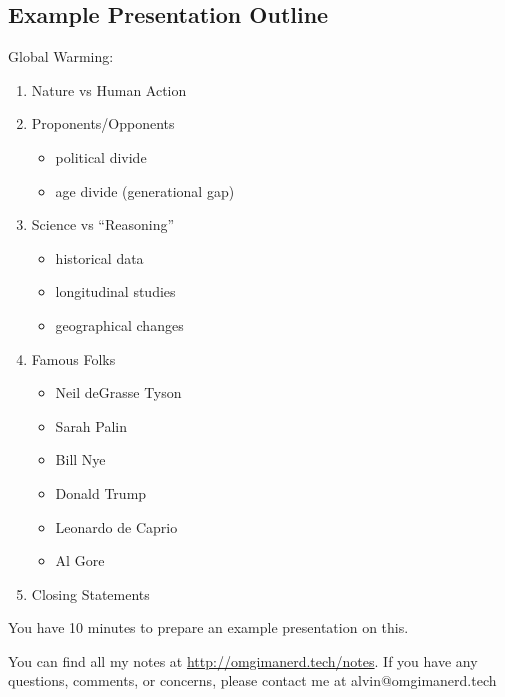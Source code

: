 \documentclass[letterpaper, 12pt]{article}
\begin{document}
\subsection*{Example Presentation Outline}
Global Warming:
\begin{enumerate}
  \item Nature vs Human Action
  \item Proponents/Opponents
    \begin{itemize}
      \item political divide
      \item age divide (generational gap)
    \end{itemize}
  \item Science vs ``Reasoning''
    \begin{itemize}
      \item historical data
      \item longitudinal studies
      \item geographical changes
    \end{itemize}
  \item Famous Folks
    \begin{itemize}
      \item Neil deGrasse Tyson
      \item Sarah Palin
      \item Bill Nye
      \item Donald Trump
      \item Leonardo de Caprio
      \item Al Gore
    \end{itemize}
  \item Closing Statements
\end{enumerate}
You have 10 minutes to prepare an example presentation on this.

\begin{center}
  You can find all my notes at \url{http://omgimanerd.tech/notes}. If you have
  any questions, comments, or concerns, please contact me at
  alvin@omgimanerd.tech
\end{center}
\end{document}
